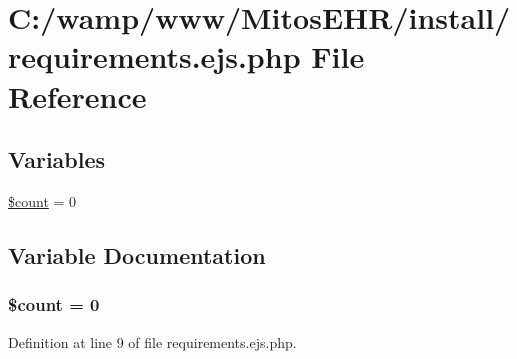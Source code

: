 \hypertarget{requirements_8ejs_8php}{\section{\-C\-:/wamp/www/\-Mitos\-E\-H\-R/install/requirements.ejs.\-php \-File \-Reference}
\label{requirements_8ejs_8php}
}
\subsection*{\-Variables}
\begin{DoxyCompactItemize}
\item 
\hyperlink{requirements_8ejs_8php_af789423037bbc89dc7c850e761177570}{\$count} = 0
\end{DoxyCompactItemize}


\subsection{\-Variable \-Documentation}
\hypertarget{requirements_8ejs_8php_af789423037bbc89dc7c850e761177570}{
\subsubsection[{\$count}]{\setlength{\rightskip}{0pt plus 5cm}\$count = 0}}\label{requirements_8ejs_8php_af789423037bbc89dc7c850e761177570}


\-Definition at line 9 of file requirements.\-ejs.\-php.

